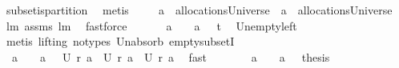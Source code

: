\begin{isabellebody}
\ subset{\isacharunderscore}is{\isacharunderscore}partition\ \isamarkupfalse%
\ metis\ \isamarkupfalse%
\ \isanewline
\ \ {\isachardoublequoteopen}{\isacharquery}a{}\ {\isasymin}\ allocationsUniverse\ {\isacharampersand}\ {\isacharquery}a{}\ {\isasymin}\ allocationsUniverse{\isachardoublequoteclose}\ \isamarkupfalse%
\ lm{}{}\ assms{\isacharparenleft}{}{\isacharparenright}\ lm{}{}\ \isamarkupfalse%
\ fastforce\ \isamarkupfalse%
\ \isamarkupfalse%
\ \isanewline
\ \ {\isachardoublequoteopen}{\isacharparenleft}{\isacharquery}a{}\ {\isacharequal}\ {\isacharbraceleft}{\isacharbraceright}\ {\isasymor}\ {\isacharquery}a{}\ {\isacharequal}\ {\isacharbraceleft}{\isacharbraceright}{\isacharparenright}{\isasymlongrightarrow}\ {\isacharquery}t{}{\isachardoublequoteclose}\ \isamarkupfalse%
\ Un{\isacharunderscore}empty{\isacharunderscore}left\ \isamarkupfalse%
\ {\isacharparenleft}metis\ {\isacharparenleft}lifting{\isacharcomma}\ no{\isacharunderscore}types{\isacharparenright}\ Un{\isacharunderscore}absorb{}\ empty{\isacharunderscore}subsetI{\isacharparenright}\ \isamarkupfalse%
\ \isamarkupfalse%
\ \isanewline
\ \ {\isachardoublequoteopen}{\isacharparenleft}{\isacharquery}a{}\ {\isacharequal}\ {\isacharbraceleft}{\isacharbraceright}\ {\isasymor}\ {\isacharquery}a{}\ {\isacharequal}\ {\isacharbraceleft}{\isacharbraceright}{\isacharparenright}{\isasymlongrightarrow}\ {\isacharquery}U\ {\isacharparenleft}{\isacharquery}r\ a{\isacharparenright}\ {\isacharequal}\ {\isacharquery}U\ {\isacharparenleft}{\isacharquery}r\ {\isacharquery}a{}{\isacharparenright}\ {\isasymunion}\ {\isacharquery}U\ {\isacharparenleft}{\isacharquery}r\ {\isacharquery}a{}{\isacharparenright}{\isachardoublequoteclose}\ \isamarkupfalse%
\ fast\ \isamarkupfalse%
\ \isamarkupfalse%
\ \isanewline
\ \ {}{\isacharcolon}\ {\isachardoublequoteopen}{\isacharparenleft}{\isacharquery}a{}\ {\isacharequal}\ {\isacharbraceleft}{\isacharbraceright}\ {\isasymor}\ {\isacharquery}a{}\ {\isacharequal}\ {\isacharbraceleft}{\isacharbraceright}{\isacharparenright}{\isasymlongrightarrow}\ {\isacharquery}thesis{\isachardoublequoteclose}\ \isamarkupfalse%
\ {}\ \isamarkupfalse%

\end{isabellebody}
